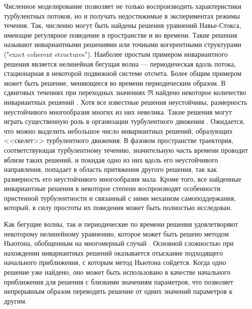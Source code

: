 Численное моделирование позволяет не только воспроизводить характеристики турбулентных потоков, но и получать недостижимые в экспериментах режимы течения. Так, численно могут быть найдены решения уравнений Навье-Стокса, имеющие регулярное поведение в пространстве и во времени. Такие решения называют инвариантными решениями или точными когерентными структурами ("exact coherent structures"). Наиболее простым примером инвариантного решения является нелинейная бегущая волна --- периодическая вдоль потока, стационарная в некоторой подвижной системе отсчета. Более общим примером может быть решение, меняющееся во времени периодическим образом. В сдвиговых течениях при переходных значениях $\Re$ найдено некоторое количество инвариантных решений \cite{Kawahara2012}. Хотя все известные решения неустойчивы, размерность неустойчивого многообразия многих из них невелика. Такие решения могут играть существенную роль в организации турбулентного движения \cite{Chaosbook}. Ожидается, что можно выделить небольшое число инвариантных решений, образующих <<скелет>> турбулентного движения. В фазовом пространстве траектория, соответствующая турбулентному течению, значительную часть времени проводит вблизи таких решений, и покидая одно из них вдоль его неустойчивого направления, попадает в область притяжения другого решения, так как размерность его неустойчивого многообразия мала. Кроме того, все найденные инвариантные решения в некоторое степени воспроизводят особенности пристенной турбулентности и связанный с ними механизм самоподдержания, который, в силу простоты их поведения может быть полностью исследован. 

Как бегущие волны, так и периодические по времени решения удовлетворяют некоторому нелинейному уравнению, которое может быть решено методом Ньютона, обобщенным на многомерный случай \cite{Viswanath2007, Dijkstra2014}. Основной сложностью при нахождении инвариантных решений оказывается отыскание подходящего начального приближения, с которым метод Ньютона сойдется. Когда одно решение уже найдено, оно может быть использовано в качестве начального приближения для решения с близкими значениям параметров, что позволяет непрерывным образом переводить решение от одних значений параметров к другим. 

